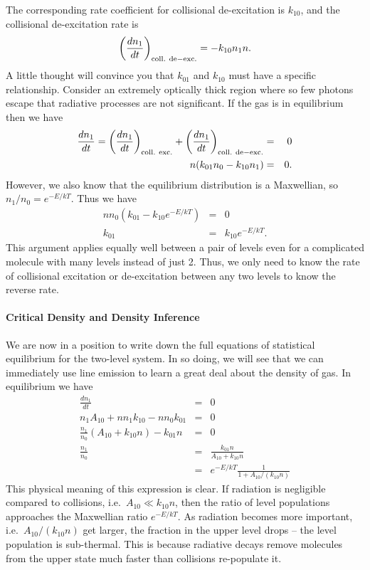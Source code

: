 The corresponding rate coefficient for collisional de-excitation is $k_{10}$, and the collisional de-excitation rate is
\begin{equation}
\left(\frac{dn_1}{dt}\right)_{\rm coll.~de-exc.} = -k_{10} n_1 n.
\end{equation}
A little thought will convince you that $k_{01}$ and $k_{10}$ must have a specific relationship. Consider an extremely optically thick region where so few photons escape that radiative processes are not significant. If the gas is in equilibrium then we have
\begin{eqnarray}
\frac{dn_1}{dt} = \left(\frac{dn_1}{dt}\right)_{\rm coll.~exc.} + \left(\frac{dn_1}{dt}\right)_{\rm coll.~de-exc.} & = & 0 \\
n (k_{01} n_0 - k_{10} n_1) & = & 0.
\end{eqnarray}
However, we also know that the equilibrium distribution is a Maxwellian, so $n_1/n_0 = e^{-E/kT}$. Thus we have
\begin{eqnarray}
n n_0 (k_{01} - k_{10} e^{-E/kT}) & = & 0 \\
k_{01} & = & k_{10} e^{-E/kT}.
\end{eqnarray}
This argument applies equally well between a pair of levels even for a complicated molecule with many levels instead of just 2. Thus, we only need to know the rate of collisional excitation or de-excitation between any two levels to know the reverse rate.

\paragraph{Critical Density and Density Inference}

We are now in a position to write down the full equations of statistical equilibrium for the two-level system. In so doing, we will see that we can immediately use line emission to learn a great deal about the density of gas. In equilibrium we have
\begin{eqnarray}
\frac{dn_1}{dt} & = & 0 \\
n_1 A_{10} + n n_1 k_{10} -n n_0 k_{01} & = & 0 \\
\frac{n_1}{n_0} \left(A_{10} + k_{10}n\right) - k_{01} n & = & 0\\
\frac{n_1}{n_0} & = & \frac{k_{01} n}{A_{10}+k_{10} n}\\
& = & e^{-E/kT} \frac{1}{1+A_{10}/(k_{10} n)}
\end{eqnarray}
This physical meaning of this expression is clear. If radiation is negligible compared to collisions, i.e.\ $A_{10} \ll k_{10} n$, then the ratio of level populations approaches the Maxwellian ratio $e^{-E/kT}$. As radiation becomes more important, i.e.\ $A_{10}/(k_{10} n)$ get larger, the fraction in the upper level drops -- the level population is sub-thermal. This is because radiative decays remove molecules from the upper state much faster than collisions re-populate it.

